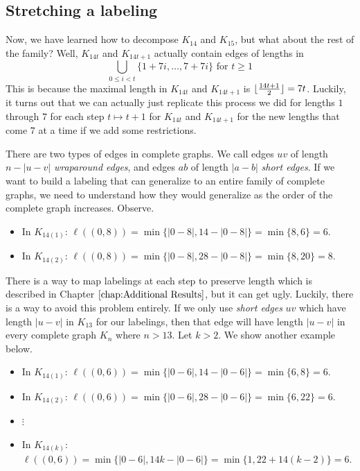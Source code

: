 \subsection{Stretching a labeling}\label{sec:0,1constr-pt2}

  Now, we have learned how to decompose $K_{14}$ and $K_{15}$, but what about the rest of the family? Well, $K_{14t}$ and $K_{14t+1}$ actually contain edges of lengths in 
  $$\bigcup_{0\leq i< t} \{1+7i,\hdots,7+7i\}\text{ for }t\geq 1$$
  This is because the maximal length in $K_{14t}$ and $K_{14t+1}$ is $\lfloor\frac{14t+1}{2}\rfloor=7t$. Luckily, it turns out that we can actually just replicate this process we did for lengths $1$ through $7$ for each step $t\mapsto t+1$ for $K_{14t}$ and $K_{14t+1}$ for the new lengths that come $7$ at a time if we add some restrictions.

  There are two types of edges in complete graphs. We call edges $uv$ of length $n-|u-v|$ \textit{wraparound edges}, and edges $ab$ of length $|a-b|$ \textit{short edges}. If we want to build a labeling that can generalize to an entire family of complete graphs, we need to understand how they would generalize as the order of the complete graph increases. Observe.
  \begin{itemize}
    \item[] In $K_{14(1)}$: $\ell((0,8))=\min\{|0-8|,14-|0-8|\}=\min\{8,6\}=6$.
    \item[] In $K_{14(2)}$: $\ell((0,8))=\min\{|0-8|,28-|0-8|\}=\min\{8,20\}=8$.
  \end{itemize}
  There is a way to map labelings at each step to preserve length which is described in Chapter $\ref{chap:Additional Results}$, but it can get ugly. Luckily, there is a way to avoid this problem entirely. If we only use \textit{short edges} $uv$ which have length $|u-v|$ in $K_{13}$ for our labelings, then that edge will have length $|u-v|$ in every complete graph $K_{n}$ where $n>13$. Let $k>2$. We show another example below.
  \begin{itemize}
    \item[] In $K_{14(1)}$: $\ell((0,6))=\min\{|0-6|,14-|0-6|\}=\min\{6,8\}=6$.
    \item[] In $K_{14(2)}$: $\ell((0,6))=\min\{|0-6|,28-|0-6|\}=\min\{6,22\}=6$.
    \item[] $\vdots$
    \item[] In $K_{14(k)}$: $\ell((0,6))=\min\{|0-6|,14k-|0-6|\}=\min\{1,22+14(k-2)\}=6$.
  \end{itemize}

